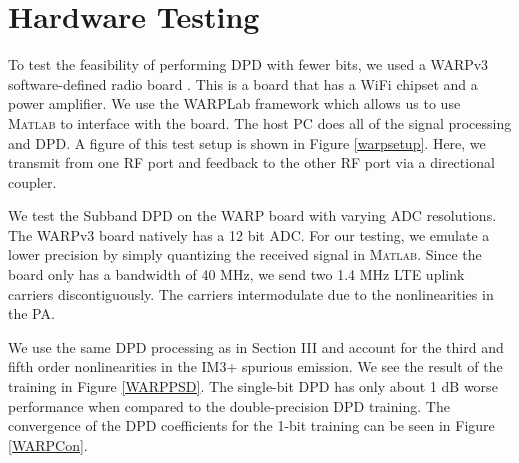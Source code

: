 \documentclass[conference]{IEEEtran}
\begin{document}

\section{Hardware Testing}
To test the feasibility of performing DPD with fewer bits, we used a WARPv3 software-defined radio board \cite{warpProject}. This is a board that has a WiFi chipset and a power amplifier. We use the WARPLab framework which allows us to use \textsc{Matlab} to interface with the board. The host PC does all of the signal processing and DPD. A figure of this test setup is shown in Figure \ref{warpsetup}. Here, we transmit from one RF port and feedback to the other RF port via a directional coupler. 

We test the Subband DPD on the WARP board with varying ADC resolutions. The WARPv3 board natively has a 12 bit ADC. For our testing, we emulate a lower precision by simply quantizing the received signal in \textsc{Matlab}. Since the board only has a bandwidth of 40 MHz, we send two 1.4 MHz LTE uplink carriers discontiguously. The carriers intermodulate due to the nonlinearities in the PA. 

We use the same DPD processing as in Section III and account for the third and fifth order nonlinearities in the IM3+ spurious emission. We see the result of the training in Figure \ref{WARPPSD}. The single-bit DPD has only about 1 dB worse performance when compared to the double-precision DPD training. The convergence of the DPD coefficients for the 1-bit training can be seen in Figure \ref{WARPCon}. 
\end{document}
